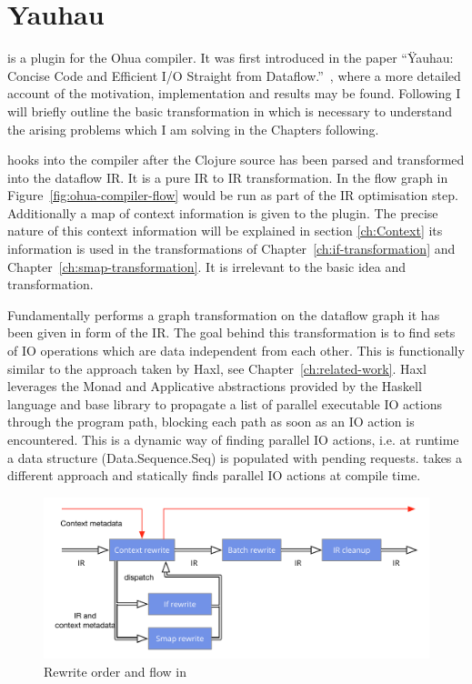 \chapter{Yauhau}

\label{ch:Yauhau}

\yauhau{} is a plugin for the Ohua compiler.
It was first introduced in the paper ``Ÿauhau: Concise Code and Efficient I/O Straight from Dataflow.''~\cite{ErtelGoensAdamEtAl2016}, where a more detailed account of the motivation, implementation and results may be found.
Following I will briefly outline the basic transformation in \yauhau{} which is necessary to understand the arising problems which I am solving in the Chapters following.

\yauhau{} hooks into the compiler after the Clojure source has been parsed and transformed into the dataflow IR.
It is a pure IR to IR transformation.
In the flow graph in Figure~\ref{fig:ohua-compiler-flow} \yauhau{} would be run as part of the IR optimisation step.
Additionally a map of context information is given to the plugin.
The precise nature of this context information will be explained in section \ref{ch:Context} its information is used in the transformations of Chapter~\ref{ch:if-transformation} and Chapter~\ref{ch:smap-transformation}.
It is irrelevant to the basic \yauhau{} idea and transformation.

Fundamentally \yauhau{} performs a graph transformation on the dataflow graph it has been given in form of the IR.
The goal behind this transformation is to find sets of IO operations which are data independent from each other.
This is functionally similar to the approach taken by Haxl\cite{Haxl:library:link}, see Chapter~\ref{ch:related-work}.
Haxl leverages the Monad and Applicative abstractions provided by the Haskell language and base library to propagate a list of parallel executable IO actions through the program path, blocking each path as soon as an IO action is encountered.
This is a dynamic way of finding parallel IO actions, i.e. at runtime a data structure (Data.Sequence.Seq) is populated with pending requests.
\yauhau{} takes a different approach and statically finds parallel IO actions at compile time.

\begin{figure}
    \includegraphics[width=\linewidth]{../Figures/yauhau-rewrite-flow}
    \caption{Rewrite order and flow in \yauhau{}}
    \label{fig:yauhau-rewrite-flow}
\end{figure}

